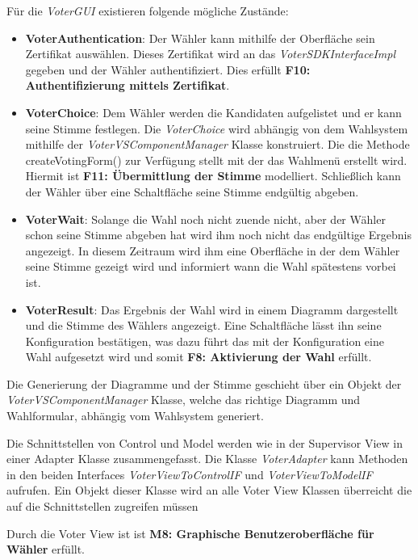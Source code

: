 \documentclass[parskip=full]{scrartcl}
\newcommand{\textitx}[1]{\mbox{\textit{#1}}}
\newcommand{\fakeparagraph}[1]{\textbf{#1}}
\begin{document}
		Für die \textitx{VoterGUI} existieren folgende mögliche Zustände:
		\begin{itemize}
			\item\fakeparagraph{VoterAuthentication}: Der Wähler kann mithilfe der Oberfläche sein Zertifikat auswählen. Dieses Zertifikat wird an das \textit{VoterSDKInterfaceImpl} gegeben und der Wähler authentifiziert. Dies erfüllt \textbf{F10: Authentifizierung mittels Zertifikat}.
			\item\fakeparagraph{VoterChoice}: Dem Wähler werden die Kandidaten aufgelistet und er kann seine Stimme festlegen. Die \textitx{VoterChoice} wird abhängig von dem Wahlsystem mithilfe der \textit{VoterVSComponentManager} Klasse konstruiert. Die die Methode createVotingForm() zur Verfügung stellt mit der das Wahlmenü erstellt wird. Hiermit ist \textbf{F11: Übermittlung der Stimme} modelliert. Schließlich kann der Wähler über eine Schaltfläche seine Stimme endgültig abgeben. 
			\item\fakeparagraph{VoterWait}: Solange die Wahl noch nicht zuende nicht, aber der Wähler schon seine Stimme abgeben hat wird ihm noch nicht das endgültige Ergebnis angezeigt. In diesem Zeitraum wird ihm eine Oberfläche in der dem Wähler seine Stimme gezeigt wird und informiert wann die Wahl spätestens vorbei ist.
			\item\fakeparagraph{VoterResult}: Das Ergebnis der Wahl wird in einem Diagramm dargestellt und die Stimme des Wählers angezeigt. Eine Schaltfläche lässt ihn seine Konfiguration bestätigen, was dazu führt das mit der Konfiguration eine Wahl aufgesetzt wird und somit \textbf{F8: Aktivierung der Wahl} erfüllt.
		\end{itemize}
	
		Die Generierung der Diagramme und der Stimme geschieht über ein Objekt der \textit{VoterVSComponentManager} Klasse, welche das richtige Diagramm und Wahlformular, abhängig vom Wahlsystem generiert.
		
		Die Schnittstellen von Control und Model werden wie in der Supervisor View in einer Adapter Klasse zusammengefasst. Die Klasse \textitx{VoterAdapter} kann Methoden in den beiden Interfaces \textit{VoterViewToControlIF} und \textit{VoterViewToModelIF} aufrufen. Ein Objekt dieser Klasse wird an alle Voter View Klassen überreicht die auf die Schnittstellen zugreifen müssen
		
		Durch die Voter View ist ist \textbf{M8: Graphische Benutzeroberfläche für Wähler} erfüllt.
	\newpage
\end{document}
